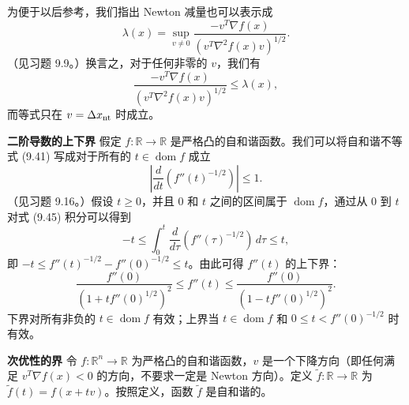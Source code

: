 \documentclass[UTF8, 12pt, fontset=fandol, oneside]{ctexart}
\begin{document}
为便于以后参考，我们指出 Newton 减量也可以表示成
\[
\lambda(x)=\sup_{v\neq0}\frac{-v^T\nabla f(x)}{(v^T\nabla^2 f(x)v)^{1/2}}.
\]
（见习题 9.9。）换言之，对于任何非零的 $v$，我们有
\begin{equation}
\frac{-v^T\nabla f(x)}{(v^T\nabla^2 f(x)v)^{1/2}}\leq\lambda(x),
\tag{9.44}
\end{equation}
而等式只在 $v=\Delta x_{\rm nt}$ 时成立。

\noindent\textbf{二阶导数的上下界}\quad
假定 $f:\mathbb{R}\to\mathbb{R}$ 是严格凸的自和谐函数。我们可以将自和谐不等式 (9.41) 写成对于所有的 $t\in\operatorname{dom} f$ 成立
\begin{equation}
\left|\frac{d}{dt}\left(f''(t)^{-1/2}\right)\right|\leq1.
\tag{9.45}
\end{equation}
（见习题 9.16。）假设 $t\geq0$，并且 $0$ 和 $t$ 之间的区间属于 $\operatorname{dom} f$，通过从 $0$ 到 $t$ 对式 (9.45) 积分可以得到
\[
-t\leq \int_0^t\frac{d}{d\tau}\left(f''(\tau)^{-1/2}\right)\,d\tau\leq t,
\]
即 $-t\leq f''(t)^{-1/2}-f''(0)^{-1/2}\leq t$。由此可得 $f''(t)$ 的上下界：
\begin{equation}
\frac{f''(0)}{(1+tf''(0)^{1/2})^2}\leq f''(t)\leq
\frac{f''(0)}{(1-tf''(0)^{1/2})^2}.
\tag{9.46}
\end{equation}
下界对所有非负的 $t\in\operatorname{dom} f$ 有效；上界当 $t\in\operatorname{dom} f$ 和 $0\leq t<f''(0)^{-1/2}$ 时有效。

\noindent\textbf{次优性的界}\quad
令 $f:\mathbb{R}^n\to\mathbb{R}$ 为严格凸的自和谐函数，$v$ 是一个下降方向（即任何满足 $v^T\nabla f(x)<0$ 的方向，不要求一定是 Newton 方向）。定义 $\tilde{f}:\mathbb{R}\to\mathbb{R}$ 为 $\tilde{f}(t)=f(x+tv)$。按照定义，函数 $\tilde{f}$ 是自和谐的。
\end{document}
